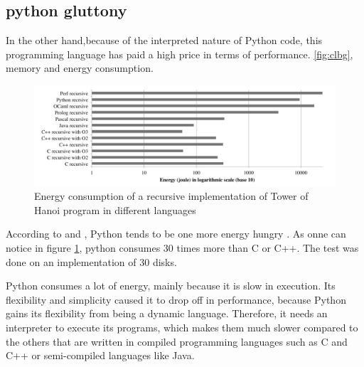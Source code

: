 


\subsection{python gluttony}

In the other hand,because of the interpreted nature of Python code, this programming language has paid a high price in terms of performance.  \ref{fig:clbg}, memory and energy consumption.

\begin{figure}[htbp]
    \includegraphics[width=\linewidth]{imgs/hannoiimplementation.png}
    \caption{Energy consumption of a recursive implementation of Tower of Hanoi program in different languages~\cite{noureddine_preliminary_2012}}
    \label{fig:hannoi}
\end{figure}

According to \cite{pinto_energy_2017} and \cite{noureddine_preliminary_2012}, Python tends to be one more energy hungry . As onne can notice in figure \ref{fig:hannoi}, python consumes 30 times more than C or C++. The test was done on an implementation of   30 disks.

Python consumes a lot of energy, mainly because it is slow in execution. Its flexibility and simplicity caused it to drop off in performance, because Python gains its flexibility from being a dynamic language. Therefore, it needs an interpreter to execute its programs, which makes them much slower compared to the others that are written in compiled programming languages such as C and C++ or semi-compiled languages like Java.


